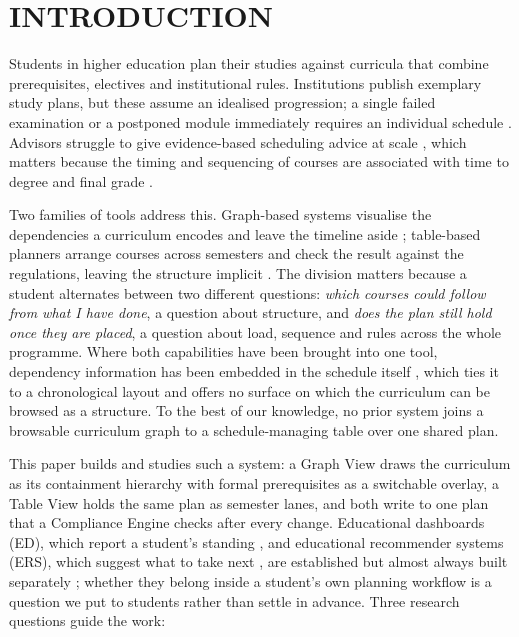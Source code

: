 \documentclass[a4paper,twoside]{article}
\begin{document}
\section{\uppercase{Introduction}}
\label{sec:introduction}

\noindent Students in higher education plan their studies against curricula that combine prerequisites, electives and institutional rules. Institutions publish exemplary study plans, but these assume an idealised progression; a single failed examination or a postponed module immediately requires an individual schedule \cite{judel_supporting_2023}. Advisors struggle to give evidence-based scheduling advice at scale \cite{schulte_large_2017}, which matters because the timing and sequencing of courses are associated with time to degree and final grade \cite{morsy_study_2019}.

Two families of tools address this. Graph-based systems visualise the dependencies a curriculum encodes and leave the timeline aside \cite{auvinen_stops_2014,rollande_graph_2013,trippel_developing_2025}; table-based planners arrange courses across semesters and check the result against the regulations, leaving the structure implicit \cite{hirmer_requirements_2022,judel_supporting_2023}. The division matters because a student alternates between two different questions: \emph{which courses could follow from what I have done}, a question about structure, and \emph{does the plan still hold once they are placed}, a question about load, sequence and rules across the whole programme. Where both capabilities have been brought into one tool, dependency information has been embedded in the schedule itself \cite{roepke_study_2024,judel_supporting_2023}, which ties it to a chronological layout and offers no surface on which the curriculum can be browsed as a structure. To the best of our knowledge, no prior system joins a browsable curriculum graph to a schedule-managing table over one shared plan.

This paper builds and studies such a system: a Graph View draws the curriculum as its containment hierarchy with formal prerequisites as a switchable overlay, a Table View holds the same plan as semester lanes, and both write to one plan that a Compliance Engine checks after every change. Educational dashboards (ED), which report a student's standing \cite{schwendimann2017,verbert_learning_2020}, and educational recommender systems (ERS), which suggest what to take next \cite{bhumichitr_recommender_2017,esteban_helping_2020}, are established but almost always built separately \cite{bodily_review_2017}; whether they belong inside a student's own planning workflow is a question we put to students rather than settle in advance. Three research questions guide the work:
\end{document}
